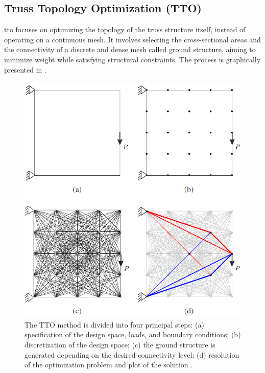 \subsection{Truss Topology Optimization (TTO)} \label{sec:02_tto}
\acrfull{tto} focuses on optimizing the topology of the truss structure itself, instead of operating on a continuous mesh. It involves selecting the cross-sectional areas and the connectivity of a discrete and dense mesh called ground structure, aiming to minimize weight while satisfying structural constraints. The process is graphically presented in .

\begin{figure}
    \centering
    \includegraphics[width=0.7\linewidth]{figures/02_literature/layopt.png}
    \caption{The TTO method is divided into four principal steps: (a)
    specification of the design space, loads, and boundary conditions; (b) discretization
    of the design space; (c) the ground structure is generated depending on the
    desired connectivity level; (d) resolution of the optimization problem and plot of
    the solution \cite{he_python_2019}.}
    \label{fig:02_tto_ex}
\end{figure}


